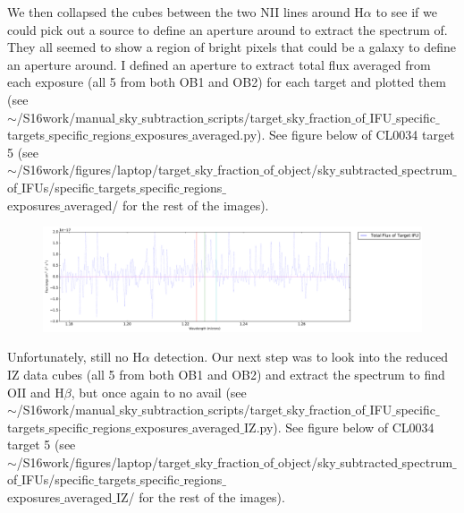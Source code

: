 \documentclass[10pt,letterpaper]{article}
\begin{document}
We then collapsed the cubes between the two NII lines around H$\alpha$ to see if we could pick out a source to define an aperture around to extract the spectrum of. They all seemed to show a region of bright pixels that could be a galaxy to define an aperture around. I defined an aperture to extract total flux averaged from each exposure (all 5 from both OB1 and OB2) for each target and plotted them (see \\$\sim$/S16work/manual$\_$sky$\_$subtraction$\_$scripts/target$\_$sky$\_$fraction$\_$of$\_$IFU$\_$specific$\_$targets$\_$specific$\_$regions$\_$exposures$\_$averaged.py). See figure below of CL0034 target 5 (see \\$\sim$/S16work/figures/laptop/target$\_$sky$\_$fraction$\_$of$\_$object/sky$\_$subtracted$\_$spectrum$\_$of$\_$IFUs/specific$\_$targets$\_$specific$\_$regions$\_$\\exposures$\_$averaged/ for the rest of the images).\\

\begin{figure}[h!]
\includegraphics[scale=0.4]{figures/CL0034-YJ_Target_5_specific_region.pdf}
\end{figure}

Unfortunately, still no H$\alpha$ detection. Our next step was to look into the reduced IZ data cubes (all 5 from both OB1 and OB2) and extract the spectrum to find OII and H$\beta$, but once again to no avail (see \\$\sim$/S16work/manual$\_$sky$\_$subtraction$\_$scripts/target$\_$sky$\_$fraction$\_$of$\_$IFU$\_$specific$\_$targets$\_$specific$\_$regions$\_$exposures$\_$averaged$\_$IZ.py). See figure below of CL0034 target 5 (see \\$\sim$/S16work/figures/laptop/target$\_$sky$\_$fraction$\_$of$\_$object/sky$\_$subtracted$\_$spectrum$\_$of$\_$IFUs/specific$\_$targets$\_$specific$\_$regions$\_$\\exposures$\_$averaged$\_$IZ/ for the rest of the images).\\
\end{document}
